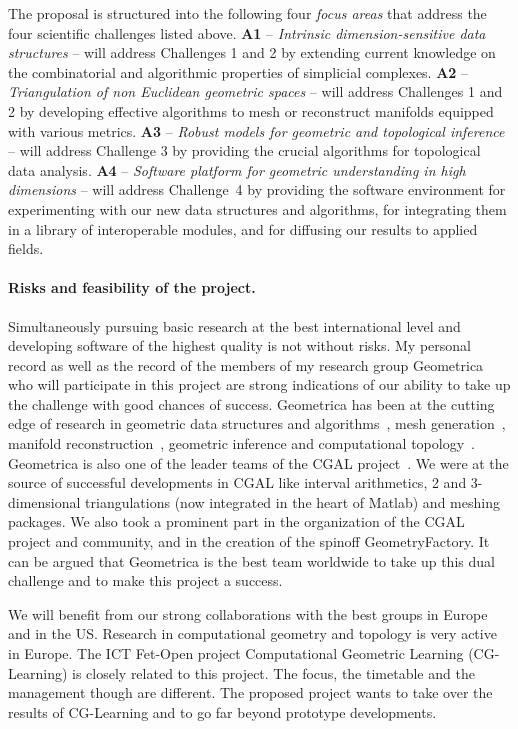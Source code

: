 The proposal is structured into the following four {\em focus areas}  that address the four scientific challenges listed above.
{\bf A1} -- {\em Intrinsic dimension-sensitive data  structures} --  will address Challenges 1 and 2 by extending current knowledge on the combinatorial and algorithmic properties of simplicial complexes. 
  {\bf A2} --  {\em Triangulation of non Euclidean geometric spaces} -- will address Challenges 1 and 2 by developing effective algorithms to mesh or reconstruct manifolds equipped with various metrics.   {\bf A3} -- {\em Robust models for geometric and topological inference} -- will address Challenge 3 by providing the crucial  algorithms for topological data analysis.
 {\bf A4} --  {\em  Software platform for geometric understanding in high dimensions} -- will address Challenge~4 by providing the software environment for experimenting with our new data structures and algorithms, for integrating them in a library of interoperable modules, and for diffusing our results to applied fields. 

\paragraph{Risks and feasibility of the project.} 
Simultaneously pursuing basic research at the best international level and developing software of the highest quality is not without risks.
My personal record as well as the record of the members of my research group Geometrica who will participate in this project are strong indications of our ability to take up the challenge with good chances of success.  Geometrica has been at the cutting edge of research in geometric data structures and algorithms~\cite{by-ag-98}, mesh generation~\cite{geometrica-ecg-book}, manifold reconstruction~\cite{geometrica-7142i,geometrica-bgo-09}, geometric inference and computational topology~\cite{geometrica-ccl09,geometrica-cseh-07}. Geometrica is also one of the leader teams of the CGAL project~\cite{cgal}.  We were at the source of successful developments in CGAL like interval arithmetics, 2 and 3-dimensional triangulations (now integrated in the heart of Matlab) and meshing packages. We also took a prominent part in the organization of the CGAL project and community, and in the creation of the spinoff GeometryFactory. It can be argued that  Geometrica is the best team worldwide to take up this dual challenge and to make this project a success. 


We will benefit from our strong collaborations with the best groups in Europe and in the US.
Research in computational geometry and topology is very active in  Europe.  The ICT Fet-Open project Computational Geometric Learning (CG-Learning) is closely related to this project. The focus, the timetable and the management though are different. The proposed project wants to take over the results of CG-Learning and to go far beyond prototype developments.  


